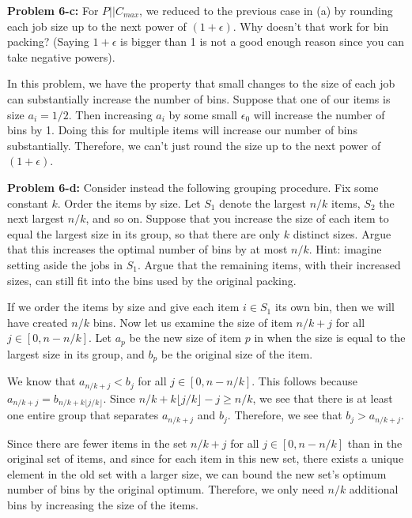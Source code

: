\documentclass[psamsfonts]{amsart}
\newenvironment{sol}{\vspace{0.25cm}{\large \bfseries Solution:}}{\qedsymbol}
\newenvironment{prob}[1]{\begin{framed}{\large \bfseries Problem #1:}}{\end{framed}}
\begin{document}
\begin{prob}{6-c}
For $P||C_{max}$, we reduced to the previous case in (a) by rounding each job size up to the next power of $(1+\epsilon)$. Why doesn't that work for bin packing? (Saying $1+\epsilon$ is bigger than 1 is not a good enough reason since you can take negative powers).
\end{prob}
\begin{sol}
In this problem, we have the property that small changes to the size of each job can substantially increase the number of bins. Suppose that one of our items is size $a_i = 1/2$. Then increasing $a_i$ by some small $\epsilon_0$ will increase the number of bins by 1. Doing this for multiple items will increase our number of bins substantially. Therefore, we can't just round the size up to the next power of $(1 + \epsilon)$. 
\end{sol}

\begin{prob}{6-d}
Consider instead the following grouping procedure. Fix some constant $k$. Order the items by size. Let $S_1$ denote the largest $n/k$ items, $S_2$ the next largest $n/k$, and so on. Suppose that you increase the size of each item to equal the largest size in its group, so that there are only $k$ distinct sizes. Argue that this increases the optimal number of bins by at most $n/k$. Hint: imagine setting aside the jobs in $S_1$. Argue that the remaining items, with their increased sizes, can still fit into the bins used by the original packing.
\end{prob}
\begin{sol}
If we order the items by size and give each item $i \in S_1$ its own bin, then we will have created $n/k$ bins. Now let us examine the size of item $n/k + j$ for all $j \in [0, n - n/k]$. Let $a_{p}$ be the new size of item $p$ in when the size is equal to the largest size in its group, and $b_{p}$ be the original size of the item. 

We know that $a_{n/k + j} < b_{j}$ for all $j \in [0, n-n/k]$. This follows because $a_{n/k +j} = b_{n/k + k\lfloor j/k \rfloor}$. Since $n/k + k \lfloor j/k \rfloor - j \geq n/k$, we see that there is at least one entire group that separates $a_{n/k+j}$ and $b_j$. Therefore, we see that $b_j > a_{n/k +j}$.

Since there are fewer items in the set $n/k + j$ for all $j \in [0, n- n/k]$ than in the original set of items, and since for each item in this new set, there exists a unique element in the old set with a larger size, we can bound the new set's optimum number of bins by the original optimum. Therefore, we only need $n/k$ additional bins by increasing the size of the items.
\end{sol}
\end{document}
